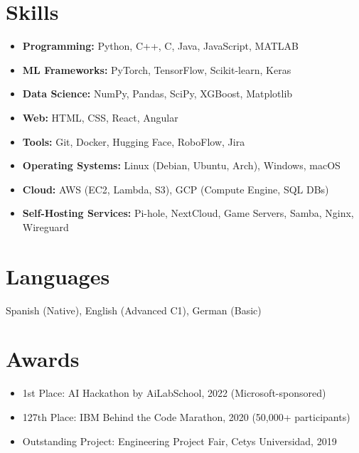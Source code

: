 \documentclass[letterpaper,11pt]{article}
\newcommand{\resumeItem}[1]{\item{\small{#1}}}
\begin{document}
\section*{Skills}
\begin{itemize}[leftmargin=0.15in, itemsep=2pt]
  \item \textbf{Programming:} Python, C++, C, Java, JavaScript, MATLAB
  \item \textbf{ML Frameworks:} PyTorch, TensorFlow, Scikit-learn, Keras
  \item \textbf{Data Science:} NumPy, Pandas, SciPy, XGBoost, Matplotlib
  \item \textbf{Web:} HTML, CSS, React, Angular
  \item \textbf{Tools:} Git, Docker, Hugging Face, RoboFlow, Jira
  \item \textbf{Operating Systems:} Linux (Debian, Ubuntu, Arch), Windows, macOS
  \item \textbf{Cloud:} AWS (EC2, Lambda, S3), GCP (Compute Engine, SQL DBs)
  \item \textbf{Self-Hosting Services:} Pi-hole, NextCloud, Game Servers, Samba, Nginx, Wireguard
\end{itemize}

\section*{Languages}
Spanish (Native), English (Advanced C1), German (Basic)

\section*{Awards}
\begin{itemize}[leftmargin=0.15in]
  \resumeItem{1st Place: AI Hackathon by AiLabSchool, 2022 (Microsoft-sponsored)}
  \resumeItem{127th Place: IBM Behind the Code Marathon, 2020 (50,000+ participants)}
  \resumeItem{Outstanding Project: Engineering Project Fair, Cetys Universidad, 2019}
\end{itemize}

\end{document}
